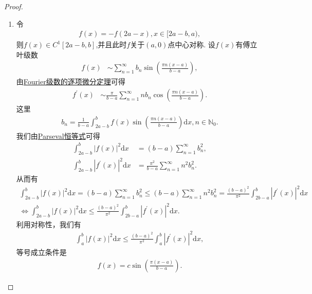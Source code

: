 \documentclass[../../main.tex]{subfiles}%
\begin{document}
\begin{proof}
\begin{enumerate}[(1)]
\item 令
\begin{align*}
f(x)=-f(2a - x), x\in[2a - b,a),
\end{align*}
则$f(x)\in C^1[2a - b,b]$,并且此时$f$关于$(a,0)$点中心对称.
设$f(x)$有傅立叶级数
\begin{align*}
f(x) &\sim \sum_{n = 1}^{\infty}b_n\sin\left(\frac{\pi n(x - a)}{b - a}\right),
\end{align*}
由\hyperref[theorem:Fourier级数的逐项微分定理]{Fourier级数的逐项微分定理}可得
\begin{align*}
f^{\prime}(x) &\sim \frac{\pi}{b - a}\sum_{n = 1}^{\infty}nb_n\cos\left(\frac{\pi n(x - a)}{b - a}\right).
\end{align*}
这里
\begin{align*}
b_n=\frac{1}{b - a}\int_{2a - b}^{b}f(x)\sin\left(\frac{\pi n(x - a)}{b - a}\right)\mathrm{d}x, n\in\mathbb{N}_0.
\end{align*}
我们由\hyperref[theorem:Parseval恒等式]{Parseval恒等式}可得
\begin{align*}
\int_{2a - b}^{b}|f(x)|^2\mathrm{d}x&=(b - a)\sum_{n = 1}^{\infty}b_n^2,\\
\int_{2a - b}^{b}|f^{\prime}(x)|^2\mathrm{d}x&=\frac{\pi^2}{b - a}\sum_{n = 1}^{\infty}n^2b_n^2.
\end{align*}
从而有
\begin{gather*}
\int_{2a-b}^b{|f(x)|^2\mathrm{d}x}=\left( b-a \right) \sum_{n=1}^{\infty}{b_{n}^{2}}\leqslant \left( b-a \right) \sum_{n=1}^{\infty}{n^2b_{n}^{2}}=\frac{(b-a)^2}{\pi ^2}\int_{2b-a}^b{|f^{\prime}(x)|^2\mathrm{d}x}
\\
\Longleftrightarrow \int_{2a-b}^b{|f(x)|^2\mathrm{d}x}\leqslant \frac{(b-a)^2}{\pi ^2}\int_{2b-a}^b{|f^{\prime}(x)|^2\mathrm{d}x}.
\end{gather*}
利用对称性，我们有
\begin{align*}
\int_{a}^{b}|f(x)|^2\mathrm{d}x\leqslant \frac{(b - a)^2}{\pi^2}\int_{a}^{b}|f^{\prime}(x)|^2\mathrm{d}x,
\end{align*}
等号成立条件是
\begin{align*}
f(x)=c\sin\left(\frac{\pi(x - a)}{b - a}\right).
\end{align*} 
\end{enumerate}
\end{proof}
\end{document}
